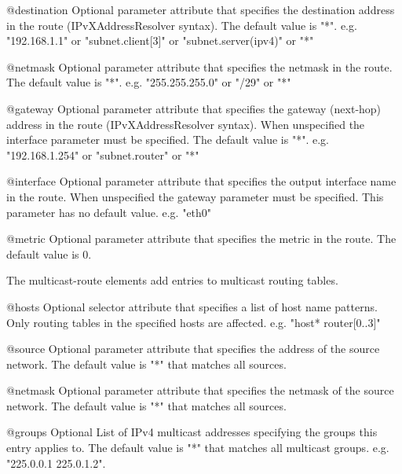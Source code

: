 \begin{description}
\begin{compactdesc}
   \item[@destination]
     Optional parameter attribute that specifies the destination address in
     the route (IPvXAddressResolver syntax). The default value is "*".
     e.g. "192.168.1.1" or "subnet.client[3]" or "subnet.server(ipv4)" or "*"

   \item[@netmask]
     Optional parameter attribute that specifies the netmask in the route.
     The default value is "*".
     e.g. "255.255.255.0" or "/29" or "*"

   \item[@gateway]
     Optional parameter attribute that specifies the gateway (next-hop)
     address in the route (IPvXAddressResolver syntax). When unspecified
     the interface parameter must be specified. The default value is "*".
     e.g. "192.168.1.254" or "subnet.router" or "*"

   \item[@interface]
     Optional parameter attribute that specifies the output interface name
     in the route. When unspecified the gateway parameter must be specified.
     This parameter has no default value.
     e.g. "eth0"

   \item[@metric]
     Optional parameter attribute that specifies the metric in the route.
     The default value is 0.
   \end{compactdesc}
 \item[<multicast-route>]
   The multicast-route elements add entries to multicast routing tables.
   \begin{compactdesc}
   \item[@hosts]
     Optional selector attribute that specifies a list of host name patterns.
     Only routing tables in the specified hosts are affected.
     e.g. "host* router[0..3]"

   \item[@source]
     Optional parameter attribute that specifies the address of the source
     network. The default value is "*" that matches all sources.

   \item[@netmask]
     Optional parameter attribute that specifies the netmask of the source
     network. The default value is "*" that matches all sources.

   \item[@groups]
     Optional List of IPv4 multicast addresses specifying the groups this entry
     applies to. The default value is "*" that matches all multicast groups.
     e.g. "225.0.0.1 225.0.1.2".


\end{compactdesc}
\end{description}
